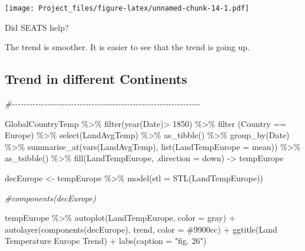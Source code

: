 \documentclass[
]{article}
\newenvironment{Shaded}{\begin{snugshade}}{\end{snugshade}}
\newcommand{\AttributeTok}[1]{\textcolor[rgb]{0.77,0.63,0.00}{#1}}
\newcommand{\CommentTok}[1]{\textcolor[rgb]{0.56,0.35,0.01}{\textit{#1}}}
\newcommand{\DecValTok}[1]{\textcolor[rgb]{0.00,0.00,0.81}{#1}}
\newcommand{\FunctionTok}[1]{\textcolor[rgb]{0.00,0.00,0.00}{#1}}
\newcommand{\NormalTok}[1]{#1}
\newcommand{\OtherTok}[1]{\textcolor[rgb]{0.56,0.35,0.01}{#1}}
\newcommand{\SpecialCharTok}[1]{\textcolor[rgb]{0.00,0.00,0.00}{#1}}
\newcommand{\StringTok}[1]{\textcolor[rgb]{0.31,0.60,0.02}{#1}}
\begin{document}
\texttt{[image: Project\_files/figure-latex/unnamed-chunk-14-1.pdf]}

Did SEATS help?

The trend is smoother. It is easier to see that the trend is going up.

\hypertarget{trend-in-different-continents}{%
\subsection{Trend in different
Continents}\label{trend-in-different-continents}}

\begin{Shaded}
\begin{Highlighting}[]
\CommentTok{\#{-}{-}{-}{-}{-}{-}{-}{-}{-}{-}{-}{-}{-}{-}{-}{-}{-}{-}{-}{-}{-}{-}{-}{-}{-}{-}{-}{-}{-}{-}{-}{-}{-}{-}{-}{-}{-}{-}{-}{-}{-}{-}{-}{-}{-}{-}{-}{-}{-}{-}{-}{-}{-}{-}{-}{-}{-}{-}{-}{-}{-}{-}{-}{-}}

\NormalTok{GlobalCountryTemp }\SpecialCharTok{\%\textgreater{}\%}
  \FunctionTok{filter}\NormalTok{(}\FunctionTok{year}\NormalTok{(Date)}\SpecialCharTok{\textgreater{}} \DecValTok{1850}\NormalTok{) }\SpecialCharTok{\%\textgreater{}\%}
  \FunctionTok{filter}\NormalTok{ (Country }\SpecialCharTok{==} \StringTok{\textquotesingle{}Europe\textquotesingle{}}\NormalTok{) }\SpecialCharTok{\%\textgreater{}\%}
  \FunctionTok{select}\NormalTok{(LandAvgTemp) }\SpecialCharTok{\%\textgreater{}\%}
  \FunctionTok{as\_tibble}\NormalTok{() }\SpecialCharTok{\%\textgreater{}\%}
  \FunctionTok{group\_by}\NormalTok{(Date) }\SpecialCharTok{\%\textgreater{}\%} 
  \FunctionTok{summarise\_at}\NormalTok{(}\FunctionTok{vars}\NormalTok{(LandAvgTemp), }\FunctionTok{list}\NormalTok{(}\AttributeTok{LandTempEurope =}\NormalTok{ mean)) }\SpecialCharTok{\%\textgreater{}\%}
  \FunctionTok{as\_tsibble}\NormalTok{() }\SpecialCharTok{\%\textgreater{}\%}
  \FunctionTok{fill}\NormalTok{(LandTempEurope, }\AttributeTok{.direction =} \StringTok{\textquotesingle{}down\textquotesingle{}}\NormalTok{) }\OtherTok{{-}\textgreater{}}\NormalTok{ tempEurope}

\NormalTok{decEurope }\OtherTok{\textless{}{-}}\NormalTok{ tempEurope }\SpecialCharTok{\%\textgreater{}\%} 
  \FunctionTok{model}\NormalTok{(}\AttributeTok{stl =} \FunctionTok{STL}\NormalTok{(LandTempEurope))}

\CommentTok{\#components(decEurope)}

\NormalTok{tempEurope }\SpecialCharTok{\%\textgreater{}\%}
  \FunctionTok{autoplot}\NormalTok{(LandTempEurope, }\AttributeTok{color =} \StringTok{\textquotesingle{}gray\textquotesingle{}}\NormalTok{) }\SpecialCharTok{+} 
  \FunctionTok{autolayer}\NormalTok{(}\FunctionTok{components}\NormalTok{(decEurope), trend, }\AttributeTok{color =} \StringTok{\textquotesingle{}\#9900cc\textquotesingle{}}\NormalTok{) }\SpecialCharTok{+} 
  \FunctionTok{ggtitle}\NormalTok{(}\StringTok{\textquotesingle{}Land Temperature Europe Trend\textquotesingle{}}\NormalTok{) }\SpecialCharTok{+}
  \FunctionTok{labs}\NormalTok{(}\AttributeTok{caption =} \StringTok{"fig. 26"}\NormalTok{)}
\end{Highlighting}
\end{Shaded}
\end{document}
